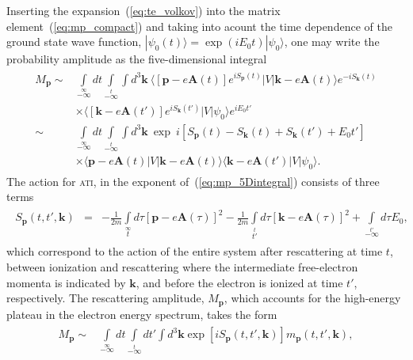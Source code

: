 Inserting the expansion~(\ref{eq:te_volkov}) into the matrix
element~(\ref{eq:mp_compact}) and taking into acount the time
dependence of the ground state wave function, $|\psi_{0}(t) \rangle =
\exp{(iE_{0}t)} | \psi_{0} \rangle$, one may write the probability
amplitude as the five-dimensional integral~\cite{KopoldOptComm2000}
%
\begin{eqnarray}
  \label{eq:mp_5Dintegral}
  \begin{split}
    M_{\mathbf{p}} \sim & \int\limits_{-\infty}\limits^{\infty} dt
    \int\limits_{-\infty}\limits^{t} \int d^{3}\mathbf{k}\ 
    \langle [\mathbf{p} - e\mathbf{A}(t)] e^{iS_{\mathbf{p}}(t)} | V |
    \mathbf{k} - e\mathbf{A}(t) \rangle e^{-iS_{\mathbf{k}}(t)} \\
    & \times
    \langle [\mathbf{k} - e\mathbf{A}(t')] e^{iS_{\mathbf{k}}(t')} | V |
    \psi_{0} \rangle e^{iE_{0}t'} \\
    \sim &
    \int\limits_{-\infty}\limits^{\infty} dt
    \int\limits_{-\infty}\limits^{t} \int d^{3}\mathbf{k}\ 
    \exp\ i\left[ S_{\mathbf{p}}(t) - S_{\mathbf{k}}(t)
      + S_{\mathbf{k}}(t') + E_{0}t' \right] \\
    & \times
    \langle \mathbf{p} - e\mathbf{A}(t) | V |
    \mathbf{k} - e\mathbf{A}(t) \rangle 
    \langle \mathbf{k} - e\mathbf{A}(t') | V |
    \psi_{0} \rangle.
  \end{split}
\end{eqnarray}
%
The action for \textsc{ati}, in the exponent
of~(\ref{eq:mp_5Dintegral}) consists of three terms
%
\begin{eqnarray}
  \label{eq:action_mpintegral}
  \begin{split}
    S_{\mathbf{p}}(t, t', \mathbf{k}) & = & - \frac{1}{2m}
    \int\limits_{t}\limits^{\infty} d\tau [\mathbf{p} - e\mathbf{A}(\tau)]^{2}
    - \frac{1}{2m} \int\limits_{t'}\limits^{t} d\tau [\mathbf{k} - e\mathbf{A}(\tau)]^{2}
    + \int\limits_{-\infty}\limits^{t'} d\tau E_{0},
  \end{split}
\end{eqnarray}
%
which correspond to the action of the entire system after rescattering
at time $t$, between ionization and rescattering where the
intermediate free-electron momenta is indicated by $\mathbf{k}$, and
before the electron is ionized at time $t'$, respectively. The
rescattering amplitude, $M_{\mathbf{p}}$, which accounts for the
high-energy plateau in the electron energy spectrum, takes the
form~\cite{Becker_ati2002,BeckerTEOp_2006}
%
\begin{eqnarray}
\label{eq:mp_final}
\begin{split}
M_{\mathbf{p}} \sim &
\int\limits_{-\infty}\limits^{\infty} dt
\int\limits_{-\infty}\limits^{t} dt'
\int d^{3}\mathbf{k} \exp \left[ iS_{\mathbf{p}}(t, t', \mathbf{k}) \right]
m_{\mathbf{p}}(t, t', \mathbf{k}),
\end{split}
\end{eqnarray}
